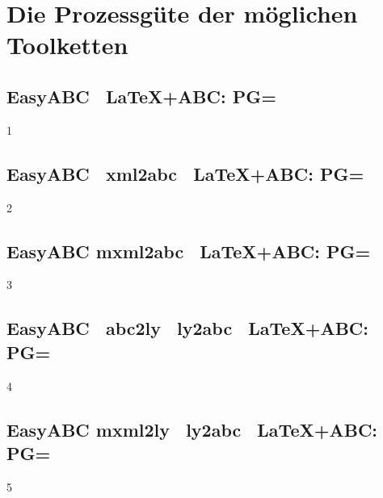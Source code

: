 %
%
%

\section{Die Prozessgüte der möglichen Toolketten}

\subsection{Easy\-ABC \ra\ \LaTeX+ABC: PG=}

1

\subsection{Easy\-ABC \ra\ xml2abc \ra\ \LaTeX+ABC: PG=}

2

\subsection{Easy\-ABC \ra mxml2abc \ra\ \LaTeX+ABC: PG=}

3

\subsection{Easy\-ABC \ra\ abc2ly \ra\ ly2abc \ra\ \LaTeX+ABC: PG=}

4

\subsection{Easy\-ABC \ra mxml2ly \ra\ ly2abc \ra\ \LaTeX+ABC: PG=}

5

